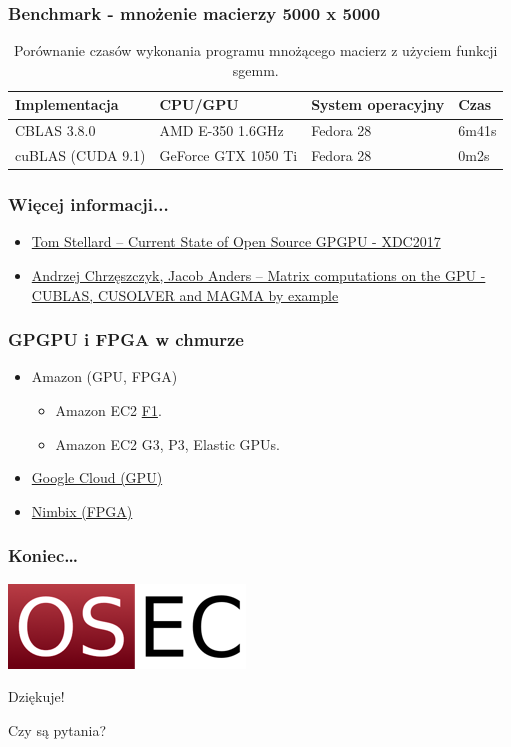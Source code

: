 \documentclass[dvipsnames,table]{beamer}
\begin{document}
\begin{frame}
\frametitle{Benchmark - mnożenie macierzy 5000 x 5000}
\begin{table}[]
\centering
\caption{Porównanie czasów wykonania programu mnożącego macierz z użyciem funkcji sgemm.}
\label{porownanie}
\scriptsize
\begin{tabular}{llll}
\hline
Implementacja & CPU/GPU   & System operacyjny & Czas  \\ \hline
CBLAS 3.8.0   & AMD E-350 1.6GHz & Fedora 28         & 6m41s \\
cuBLAS (CUDA 9.1) & GeForce GTX 1050 Ti & Fedora 28 & 0m2s  \\ \hline
\end{tabular}
\normalsize
\end{table}
\end{frame}

\begin{frame}
\frametitle{Więcej informacji...}
\begin{itemize}
	\item \href{https://www.x.org/wiki/Events/XDC2017/Stellard_GPGPU.pdf}{Tom Stellard -- Current State of Open Source GPGPU - XDC2017}
	\item \href{https://developer.nvidia.com/sites/default/files/akamai/cuda/files/Misc/mygpu.pdf}{Andrzej Chrzęszczyk, Jacob Anders -- Matrix computations on the GPU - CUBLAS, CUSOLVER and MAGMA by example}

\end{itemize}
\end{frame}

\begin{frame}
	\frametitle{GPGPU i FPGA w chmurze}
\begin{itemize}
	\item Amazon (GPU, FPGA)
	\begin{itemize}
		\item Amazon EC2 \href{https://aws.amazon.com/ec2/instance-types/f1/}{F1}.
		\item Amazon EC2 G3, P3, Elastic GPUs.
	\end{itemize}
	\item \href{https://cloud.google.com/gpu/}{Google Cloud (GPU)}
	\item \href{https://www.nimbix.net/xilinx/}{Nimbix (FPGA)}
\end{itemize}
\end{frame}


\begin{frame}
\frametitle{Koniec\ldots}
\begin{center}
\includegraphics[scale=0.5]{img-oseclogo.png}

Dziękuje!

Czy są pytania?

\end{center}
\end{frame}
\end{document}
